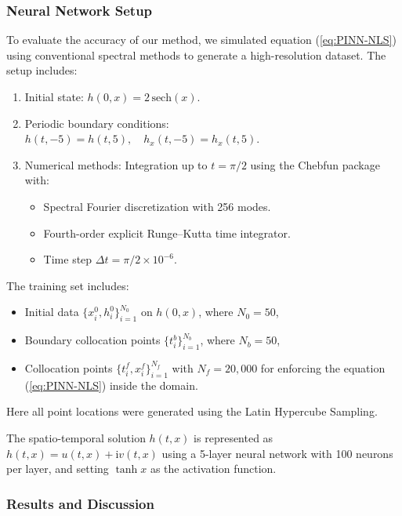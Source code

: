 \documentclass[lang=cn,a4paper,newtx]{elegantpaper}
\newcommand{\sech}{\text{sech}}
\renewcommand{\i}{\mathrm{i}}
\begin{document}
\subsubsection{Neural Network Setup}
To evaluate the accuracy of our method, we simulated equation (\ref{eq:PINN-NLS}) using conventional spectral methods to generate a high-resolution dataset. The setup includes:
\begin{enumerate}
    \item Initial state: $h(0, x) = 2 \, \sech(x)$.
    \item Periodic boundary conditions: $h(t, -5) = h(t, 5), \quad h_x(t, -5) = h_x(t, 5) $.
    \item Numerical methods: Integration up to $t = \pi/2$ using the Chebfun package with:
    \begin{itemize}
        \item Spectral Fourier discretization with 256 modes.
        \item Fourth-order explicit Runge–Kutta time integrator.
        \item Time step $\Delta t = \pi/2 \times 10^{-6}$.
    \end{itemize}
\end{enumerate}
The training set includes:
\begin{itemize}
    \item Initial data $ \{x_i^0, h_i^0\}_{i=1}^{N_0} $ on $ h(0,x) $, where $ N_0 = 50 $,
    \item Boundary collocation points $ \{t_i^b\}_{i=1}^{N_b} $, where $ N_b = 50 $,
    \item Collocation points $ \{t_i^f, x_i^f\}_{i=1}^{N_f} $ with $ N_f = 20,000 $ for enforcing the equation (\ref{eq:PINN-NLS}) inside the domain.
\end{itemize}
Here all point locations were generated using the Latin Hypercube Sampling.

The spatio-temporal solution $h(t, x)$ is represented as $h(t, x) = u(t, x) + \i v(t, x) $ using a 5-layer neural network with 100 neurons per layer, and setting $ \tanh x $ as the activation function. 

\subsubsection{Results and Discussion}
\end{document}
